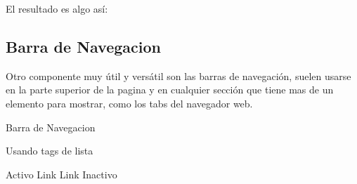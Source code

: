 \documentclass[letterpaper,10pt,spanish]{sphinxmanual}
\begin{document}
El resultado es algo así:

\begin{figure}[htbp]
\centering

\noindent{}
\end{figure}


\subsection{Barra de Navegacion}
\label{\detokenize{reusando-estilo-de-otros:barra-de-navegacion}}
Otro componente muy útil y versátil son las barras de navegación, suelen usarse
en la parte superior de la pagina y en cualquier sección que tiene mas de un
elemento para mostrar, como los tabs del navegador web.

%
\begin{sphinxVerbatim}[commandchars=\\\{\}]
Barra de Navegacion

Usando tags de lista

 
   
      Activo
   
      Link
   
      Link
   
      Inactivo


\end{sphinxVerbatim}
\end{document}

